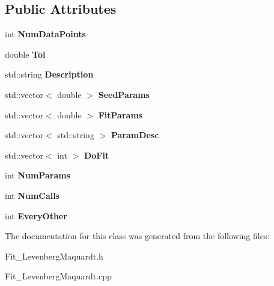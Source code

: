 \subsection*{Public Attributes}
\begin{DoxyCompactItemize}
\item 
\hypertarget{class_t_model_base_a141a231d1206ee8f9ffcd3e63bfd89af}{int {\bfseries Num\+Data\+Points}}\label{class_t_model_base_a141a231d1206ee8f9ffcd3e63bfd89af}

\item 
\hypertarget{class_t_model_base_a8be201a23a96e6c9290fda2c2e1814da}{double {\bfseries Tol}}\label{class_t_model_base_a8be201a23a96e6c9290fda2c2e1814da}

\item 
\hypertarget{class_t_model_base_a2a1152e491c7a8daa9eb62ddacaccd00}{std\+::string {\bfseries Description}}\label{class_t_model_base_a2a1152e491c7a8daa9eb62ddacaccd00}

\item 
\hypertarget{class_t_model_base_a121d715cf9c4ed34beb058a9ac786984}{std\+::vector$<$ double $>$ {\bfseries Seed\+Params}}\label{class_t_model_base_a121d715cf9c4ed34beb058a9ac786984}

\item 
\hypertarget{class_t_model_base_a201dbd704caa57660bec39afc6437889}{std\+::vector$<$ double $>$ {\bfseries Fit\+Params}}\label{class_t_model_base_a201dbd704caa57660bec39afc6437889}

\item 
\hypertarget{class_t_model_base_a2f40d254d600d2974973a47ccd418521}{std\+::vector$<$ std\+::string $>$ {\bfseries Param\+Desc}}\label{class_t_model_base_a2f40d254d600d2974973a47ccd418521}

\item 
\hypertarget{class_t_model_base_a6c2c3425fcbb0c039761eebe7067d221}{std\+::vector$<$ int $>$ {\bfseries Do\+Fit}}\label{class_t_model_base_a6c2c3425fcbb0c039761eebe7067d221}

\item 
\hypertarget{class_t_model_base_a4b5f5e1aa456a05ccfcbb5162c1975b9}{int {\bfseries Num\+Params}}\label{class_t_model_base_a4b5f5e1aa456a05ccfcbb5162c1975b9}

\item 
\hypertarget{class_t_model_base_af5b576699d5814295b16078d3781a099}{int {\bfseries Num\+Calls}}\label{class_t_model_base_af5b576699d5814295b16078d3781a099}

\item 
\hypertarget{class_t_model_base_a2669507f1778e5a0cf34dc94385f5cea}{int {\bfseries Every\+Other}}\label{class_t_model_base_a2669507f1778e5a0cf34dc94385f5cea}

\end{DoxyCompactItemize}


The documentation for this class was generated from the following files\+:\begin{DoxyCompactItemize}
\item 
Fit\+\_\+\+Levenberg\+Maquardt.\+h\item 
Fit\+\_\+\+Levenberg\+Maquardt.\+cpp\end{DoxyCompactItemize}

